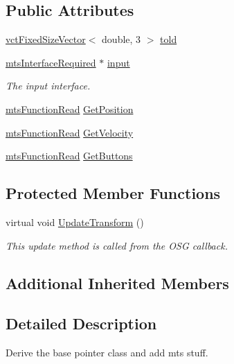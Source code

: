 \subsection*{Public Attributes}
\begin{DoxyCompactItemize}
\item 
\hyperlink{classvct_fixed_size_vector}{vct\-Fixed\-Size\-Vector}$<$ double, 3 $>$ \hyperlink{classmts_o_s_g_pointer3_d_1_1_pointer_ac94be80751edb5e58d4ee60957cdd3a3}{told}
\item 
\hyperlink{classmts_interface_required}{mts\-Interface\-Required} $\ast$ \hyperlink{classmts_o_s_g_pointer3_d_1_1_pointer_af85d097dea05276c496eccf2025e575b}{input}
\begin{DoxyCompactList}\small\item\em The input interface. \end{DoxyCompactList}\item 
\hyperlink{classmts_function_read}{mts\-Function\-Read} \hyperlink{classmts_o_s_g_pointer3_d_1_1_pointer_a151204448d9d738cf5dd0466fc04a4b1}{Get\-Position}
\item 
\hyperlink{classmts_function_read}{mts\-Function\-Read} \hyperlink{classmts_o_s_g_pointer3_d_1_1_pointer_a52093ee9261f7388b3e24a4201807819}{Get\-Velocity}
\item 
\hyperlink{classmts_function_read}{mts\-Function\-Read} \hyperlink{classmts_o_s_g_pointer3_d_1_1_pointer_a4f1417a7da524102eadd512eccbcdfc7}{Get\-Buttons}
\end{DoxyCompactItemize}
\subsection*{Protected Member Functions}
\begin{DoxyCompactItemize}
\item 
virtual void \hyperlink{classmts_o_s_g_pointer3_d_1_1_pointer_a34f8387720e5a62ba7b08e1fa558852b}{Update\-Transform} ()
\begin{DoxyCompactList}\small\item\em This update method is called from the O\-S\-G callback. \end{DoxyCompactList}\end{DoxyCompactItemize}
\subsection*{Additional Inherited Members}


\subsection{Detailed Description}
Derive the base pointer class and add mts stuff. 

